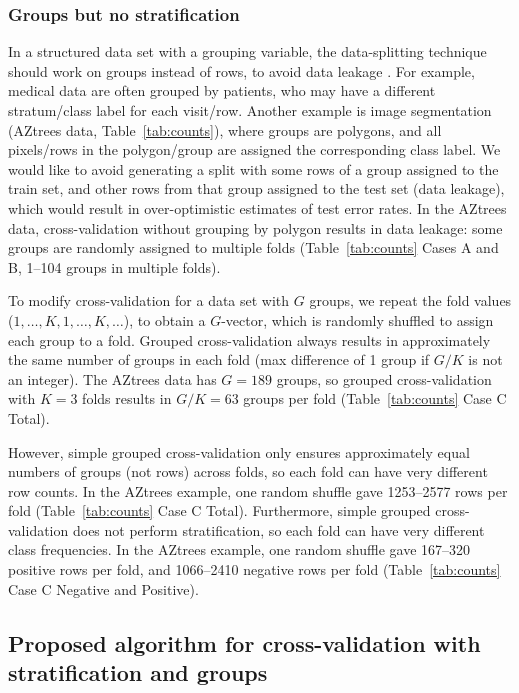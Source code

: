 \documentclass[twoside]{article}
\begin{document}
\subsubsection{%
  Groups but no stratification}

In a structured data set with a grouping variable, the data-splitting technique should work on groups instead of rows, to avoid data leakage \citep{kaufman2012leakage,kapoor2023leakage}.
For example, medical data are often grouped by patients, who may have a different stratum/class label for each visit/row.
Another example is image segmentation (AZtrees data, Table~\ref{tab:counts}), where groups are polygons, and all pixels/rows in the polygon/group are assigned the corresponding class label.
We would like to avoid generating a split with some rows of a group assigned to the train set, and other rows from that group assigned to the test set (data leakage), which would result in over-optimistic estimates of test error rates.
In the AZtrees data, cross-validation without grouping by polygon results in data leakage: some groups are randomly assigned to multiple folds (Table~\ref{tab:counts} Cases A and B, 1--104 groups in multiple folds).

To modify cross-validation for a data set with $G$ groups, we repeat the fold values ($1, \dots, K, 1, \dots, K, \dots$), to obtain a $G$-vector, which is randomly shuffled to assign each group to a fold.
Grouped cross-validation always results in approximately the same number of groups in each fold (max difference of 1 group if $G/K$ is not an integer).
The AZtrees data has $G=189$ groups, so grouped cross-validation with $K=3$ folds results in $G/K=63$ groups per fold (Table~\ref{tab:counts} Case C Total).

However, simple grouped cross-validation only ensures approximately equal numbers of groups (not rows) across folds, so each fold can have very different row counts.
In the AZtrees example, one random shuffle gave 1253--2577 rows per fold (Table~\ref{tab:counts} Case C Total).
Furthermore, simple grouped cross-validation does not perform stratification, so each fold can have very different class frequencies.
In the AZtrees example, one random shuffle gave 167--320 positive rows per fold, and 1066--2410 negative rows per fold (Table~\ref{tab:counts} Case C Negative and Positive).

\subsection{Proposed algorithm for cross-validation with stratification and groups}
\end{document}
